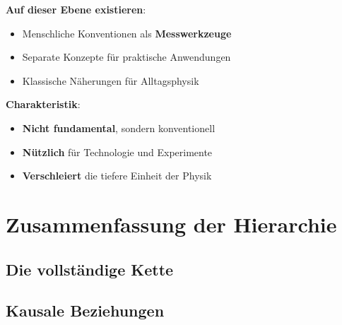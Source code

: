 \textbf{Auf dieser Ebene existieren}:
\begin{itemize}
\item Menschliche Konventionen als \textbf{Messwerkzeuge}
\item Separate Konzepte für praktische Anwendungen
\item Klassische Näherungen für Alltagsphysik
\end{itemize}

\textbf{Charakteristik}:
\begin{itemize}
\item \textbf{Nicht fundamental}, sondern konventionell
\item \textbf{Nützlich} für Technologie und Experimente
\item \textbf{Verschleiert} die tiefere Einheit der Physik
\end{itemize}

\section{Zusammenfassung der Hierarchie}

\subsection{Die vollständige Kette}

\begin{table}[h]
\centering
\small
{}
\caption{Die fünf ontologischen Ebenen}
\end{table}

\subsection{Kausale Beziehungen}

